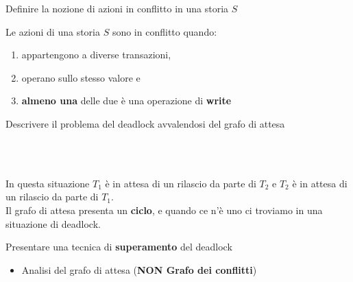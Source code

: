 \documentclass{exam}
\begin{document}
\begin{questions}
\begin{solution}
\begin{description}
          \end{description}
    \end{solution}
    \question Definire la nozione di azioni in conflitto in una storia $S$
    \begin{solution}
        Le azioni di una storia $S$ sono in conflitto quando:
        \begin{enumerate}
            \item appartengono a diverse transazioni,
            \item operano sullo stesso valore e
            \item \textbf{almeno una} delle due è una operazione di \textbf{write}
        \end{enumerate}
    \end{solution}
    \question Descrivere il problema del deadlock avvalendosi del grafo di attesa
    \begin{solution}\\
            \\
            In questa situazione $T_1$ è in attesa di un rilascio da parte di $T_2$ e $T_2$ è in attesa di un rilascio da parte di $T_1$.\\
            Il grafo di attesa presenta un \textbf{ciclo}, e quando ce n'è uno ci troviamo in una situazione di deadlock.
    \end{solution}
    \question Presentare una tecnica di \textbf{superamento} del deadlock
    \begin{solution}
        \begin{itemize}
            \item Analisi del grafo di attesa (\textbf{NON Grafo dei conflitti})\\
\end{itemize}
\end{solution}
\end{questions}
\end{document}
